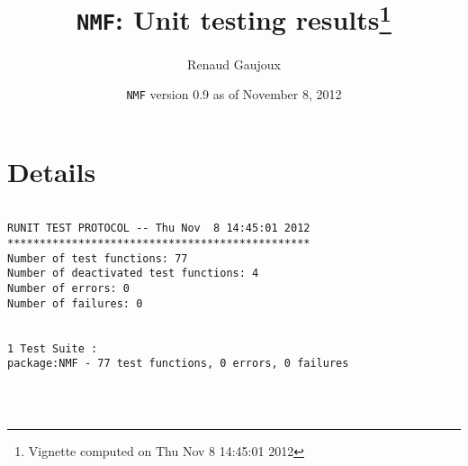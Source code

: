 \documentclass[10pt]{article}
\author{Renaud Gaujoux}
\title{\texttt{NMF}: Unit testing results\footnote{Vignette computed  on Thu Nov  8 14:45:01 2012}}
\date{\texttt{NMF} version 0.9 as of November  8, 2012}
\begin{document}
\maketitle

\section{Details}
\begin{verbatim}

RUNIT TEST PROTOCOL -- Thu Nov  8 14:45:01 2012 
*********************************************** 
Number of test functions: 77 
Number of deactivated test functions: 4 
Number of errors: 0 
Number of failures: 0 

 
1 Test Suite : 
package:NMF - 77 test functions, 0 errors, 0 failures




\end{verbatim}
\end{document}
